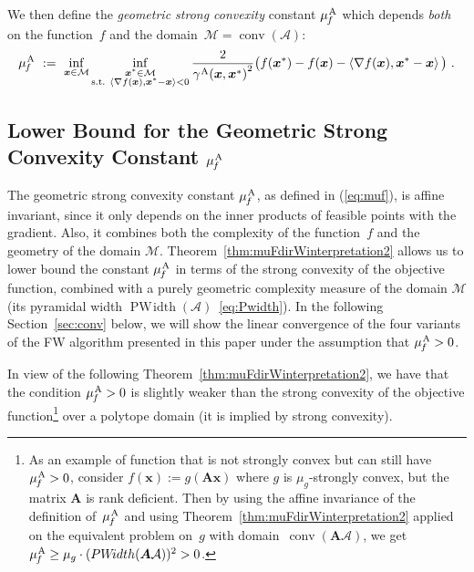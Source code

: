 \documentclass{article} %
\DeclareMathOperator*{\conv}{conv}
\newcommand{\domain}{\mathcal{M}} %
\newcommand{\stepsize}{\gamma}
\newcommand{\away}{{\hspace{0.06em}\textnormal{\scriptsize A}}}
\newcommand{\strongConvAFW}{\mu_{\hspace{-0.08em}f}^\away}
\newcommand{\x}{\bm{x}}
\newcommand{\Vertices}{\mathcal{A}} %
\newcommand{\PWidth}{\mathop{PW\!idth}}
\newcommand{\A}{\bm{A}}
\newcommand{\0}{\mathbf{0}} %
\begin{document}
%

We then define the \emph{geometric strong convexity} constant
$\strongConvAFW$ which depends \emph{both} on the function~$f$ and the
domain~$\domain=\conv(\Vertices)$:
\begin{equation}\label{eq:muf}
  \strongConvAFW \ :=\  \inf_{\x\in \domain} \inf_{\substack{\x^* \in \domain\\
                        \textrm{s.t. } \left\langle \nabla f(\x), \x^*-\x \right\rangle < 0 }}
           \frac{2}{{\stepsize^\away(\x,\x^*)}^2}
           \big( f(\x^*)-f(\x)-\left\langle \nabla f(\x),  \x^*-\x \right\rangle \big) \ .
\end{equation}


%

%

%
%
%
%
%

%




%
%

%
%
%
%
%
%
%
%
%
%
%
%
%
%
%
%
%
%
%
%
%
%
%
%
%
%
%
%
%
%
%
%
%
%


%
\subsection{Lower Bound for the Geometric Strong Convexity Constant $\strongConvAFW$}
The geometric strong convexity constant $\strongConvAFW$, as defined in
(\ref{eq:muf}), is affine invariant, since it only depends on the inner
products of feasible points with the gradient. Also, it combines both the
complexity of the function~$f$ and the geometry of the domain $\domain$.
Theorem~\ref{thm:muFdirWinterpretation2} allows us to lower bound the constant
$\strongConvAFW$ in terms of the strong convexity of the objective function,
combined with a purely geometric complexity measure of the domain $\domain$
(its pyramidal width $\PWidth(\Vertices)$~\eqref{eq:Pwidth}).
In the following Section~\ref{sec:conv} below, we will show the linear
convergence of the four variants of the FW algorithm presented in this paper under the assumption that
$\strongConvAFW > 0$. 

In view of the following Theorem~\ref{thm:muFdirWinterpretation2}, we have 
that the condition $\strongConvAFW > 0$ is slightly weaker
 than the strong 
convexity of the objective function\footnote{As an example
of function that is not strongly convex but can still have $\strongConvAFW > 0$,
consider $f(\x) := g(\A \x)$ where $g$ is $\mu_g$-strongly convex, but the
matrix $\A$ is rank deficient. Then by using the affine invariance
of the definition of~$\strongConvAFW$ and 
using Theorem~\eqref{thm:muFdirWinterpretation2} applied
on the equivalent problem on~$g$ with domain~$\conv(\A \Vertices)$,
we get $\strongConvAFW \geq \mu_g \cdot (\PWidth(\A \Vertices))^2 > 0$.
} over a polytope domain 
(it is implied by strong convexity).
\end{document}
